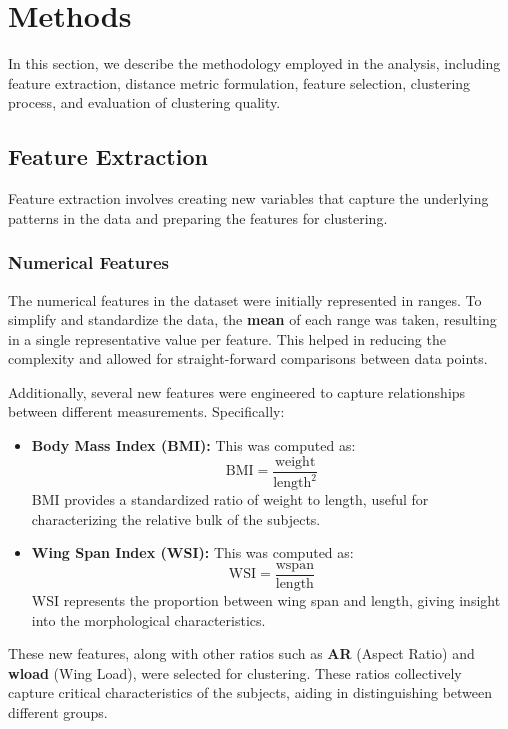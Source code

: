 \section{Methods}
In this section, we describe the methodology employed in the analysis, including feature extraction, distance metric formulation, feature selection, clustering process, and evaluation of clustering quality.

\subsection{Feature Extraction}
Feature extraction involves creating new variables that capture the underlying patterns in the data and preparing the features for clustering.

\subsubsection{Numerical Features}
The numerical features in the dataset were initially represented in ranges. To simplify and standardize the data, the \textbf{mean} of each range was taken, resulting in a single representative value per feature. This helped in reducing the complexity and allowed for straight-forward comparisons between data points.

Additionally, several new features were engineered to capture relationships between different measurements. Specifically:

\begin{itemize}
    \item \textbf{Body Mass Index (BMI):} This was computed as:
    \[
    \text{BMI} = \frac{\text{weight}}{\text{length}^2}
    \]
    BMI provides a standardized ratio of weight to length, useful for characterizing the relative bulk of the subjects.

    \item \textbf{Wing Span Index (WSI):} This was computed as:
    \[
    \text{WSI} = \frac{\text{wspan}}{\text{length}}
    \]
    WSI represents the proportion between wing span and length, giving insight into the morphological characteristics.
\end{itemize}

These new features, along with other ratios such as \textbf{AR} (Aspect Ratio) and \textbf{wload} (Wing Load), were selected for clustering. These ratios collectively capture critical characteristics of the subjects, aiding in distinguishing between different groups.

